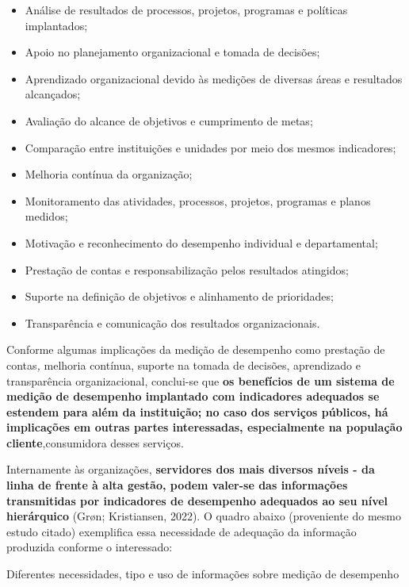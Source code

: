 \documentclass[
  letterpaper,
  DIV=11,
  numbers=noendperiod]{scrreprt}
\begin{document}
\begin{itemize}
\item
  Análise de resultados de processos, projetos, programas e políticas
  implantados;
\item
  Apoio no planejamento organizacional e tomada de decisões;
\item
  Aprendizado organizacional devido às medições de diversas áreas e
  resultados alcançados;
\item
  Avaliação do alcance de objetivos e cumprimento de metas;
\item
  Comparação entre instituições e unidades por meio dos mesmos
  indicadores;
\item
  Melhoria contínua da organização;
\item
  Monitoramento das atividades, processos, projetos, programas e planos
  medidos;
\item
  Motivação e reconhecimento do desempenho individual e departamental;
\item
  Prestação de contas e responsabilização pelos resultados atingidos;
\item
  Suporte na definição de objetivos e alinhamento de prioridades;
\item
  Transparência e comunicação dos resultados organizacionais.
\end{itemize}

Conforme algumas implicações da medição de desempenho como prestação de
contas\emph{,} melhoria contínua, suporte na tomada de decisões,
aprendizado e transparência organizacional, conclui-se que \textbf{os
benefícios de um sistema de medição de desempenho implantado com
indicadores adequados se estendem para além da instituição; no caso dos
serviços públicos, há implicações em outras partes interessadas,
especialmente na população cliente},consumidora desses serviços.

Internamente às organizações, \textbf{servidores dos mais diversos
níveis - da linha de frente à alta gestão, podem valer-se das
informações transmitidas por indicadores de desempenho adequados ao seu
nível hierárquico} (Grøn; Kristiansen, 2022). O quadro abaixo
(proveniente do mesmo estudo citado) exemplifica essa necessidade de
adequação da informação produzida conforme o interessado:

Diferentes necessidades, tipo e uso de informações sobre medição de
desempenho
\end{document}
